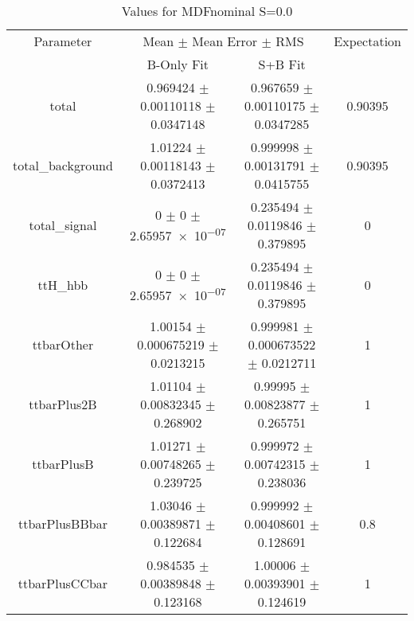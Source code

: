 \begin{table}
\centering
\caption{Values for MDFnominal S=0.0}
\begin{tabular}{cccc}
\toprule
Parameter & \multicolumn{2}{c}{Mean $\pm$ Mean Error $\pm$ RMS} & Expectation\\
 & B-Only Fit & S+B Fit & \\
\midrule
total & \num{0.969424} $\pm$ \num{0.00110118} $\pm$ \num{0.0347148} & \num{0.967659} $\pm$ \num{0.00110175} $\pm$ \num{0.0347285} & \num{0.90395}\\
total\_background & \num{1.01224} $\pm$ \num{0.00118143} $\pm$ \num{0.0372413} & \num{0.999998} $\pm$ \num{0.00131791} $\pm$ \num{0.0415755} & \num{0.90395}\\
total\_signal & \num{0} $\pm$ \num{0} $\pm$ \num{2.65957e-07} & \num{0.235494} $\pm$ \num{0.0119846} $\pm$ \num{0.379895} & \num{0}\\
ttH\_hbb & \num{0} $\pm$ \num{0} $\pm$ \num{2.65957e-07} & \num{0.235494} $\pm$ \num{0.0119846} $\pm$ \num{0.379895} & \num{0}\\
ttbarOther & \num{1.00154} $\pm$ \num{0.000675219} $\pm$ \num{0.0213215} & \num{0.999981} $\pm$ \num{0.000673522} $\pm$ \num{0.0212711} & \num{1}\\
ttbarPlus2B & \num{1.01104} $\pm$ \num{0.00832345} $\pm$ \num{0.268902} & \num{0.99995} $\pm$ \num{0.00823877} $\pm$ \num{0.265751} & \num{1}\\
ttbarPlusB & \num{1.01271} $\pm$ \num{0.00748265} $\pm$ \num{0.239725} & \num{0.999972} $\pm$ \num{0.00742315} $\pm$ \num{0.238036} & \num{1}\\
ttbarPlusBBbar & \num{1.03046} $\pm$ \num{0.00389871} $\pm$ \num{0.122684} & \num{0.999992} $\pm$ \num{0.00408601} $\pm$ \num{0.128691} & \num{0.8}\\
ttbarPlusCCbar & \num{0.984535} $\pm$ \num{0.00389848} $\pm$ \num{0.123168} & \num{1.00006} $\pm$ \num{0.00393901} $\pm$ \num{0.124619} & \num{1}\\
\bottomrule
\end{tabular}
\end{table}